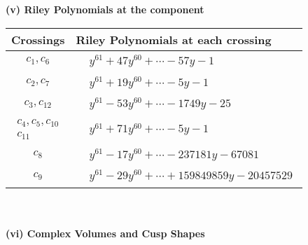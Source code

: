 \documentclass[1p]{elsarticle_modified}
\theoremstyle{definition}
\begin{document}
\newpage\renewcommand{\arraystretch}{1}
\flushleft \textbf{(v) Riley Polynomials at the component}\newline \\
\begin{tabular}{m{50pt}|m{274pt}}
Crossings & \hspace{64pt}Riley Polynomials at each crossing \\
\hline $$\begin{aligned}c_{1},c_{6}\end{aligned}$$&$\begin{aligned}
&y^{61}+47 y^{60}+\cdots-57 y-1
\end{aligned}$\\
\hline $$\begin{aligned}c_{2},c_{7}\end{aligned}$$&$\begin{aligned}
&y^{61}+19 y^{60}+\cdots-5 y-1
\end{aligned}$\\
\hline $$\begin{aligned}c_{3},c_{12}\end{aligned}$$&$\begin{aligned}
&y^{61}-53 y^{60}+\cdots-1749 y-25
\end{aligned}$\\
\hline $$\begin{aligned}c_{4},c_{5},c_{10}\\c_{11}\end{aligned}$$&$\begin{aligned}
&y^{61}+71 y^{60}+\cdots-5 y-1
\end{aligned}$\\
\hline $$\begin{aligned}c_{8}\end{aligned}$$&$\begin{aligned}
&y^{61}-17 y^{60}+\cdots-237181 y-67081
\end{aligned}$\\
\hline $$\begin{aligned}c_{9}\end{aligned}$$&$\begin{aligned}
&y^{61}-29 y^{60}+\cdots+159849859 y-20457529
\end{aligned}$\\
\hline
\end{tabular}\\~\\
\newpage\flushleft \textbf{(vi) Complex Volumes and Cusp Shapes}
\end{document}
